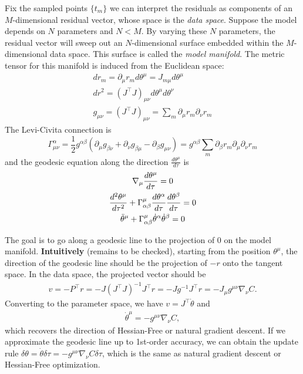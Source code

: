 \documentclass{amsart}
\theoremstyle{definition}
\theoremstyle{remark}
\numberwithin{equation}{section}
\begin{document}
Fix the sampled points $\{t_m\}$ we can interpret the residuals as components of an $M$-dimensional residual vector, whose space is the \emph{data space}. Suppose the model depends on $N$ parameters and $N < M$. By varying these $N$ parameters, the residual vector will sweep out an $N$-dimensional surface embedded within the $M$-dimensional data space. This surface is called the \textit{model manifold}. The metric tensor for this manifold is induced from the Euclidean space:
\begin{gather*}
dr_m = \partial_\mu r_m d\theta^\mu = J_{m\mu} d\theta^\mu\\
dr^2 = (J^\intercal J)_{\mu\nu} d\theta^\mu d\theta^\nu\\
g_{\mu\nu} = (J^\intercal J)_{\mu\nu} = \sum_m \partial_\mu r_m \partial_\nu r_m
\end{gather*}
The Levi-Civita connection is 
\[
 \Gamma_{\mu\nu}^\alpha = \frac{1}{2} g^{\alpha\beta} (\partial_\mu g_{\beta\nu} + \partial_\nu g_{\beta\mu} - \partial_\beta g_{\mu\nu}) = g^{\alpha\beta} \sum_{m} \partial_\beta r_m \partial_\mu\partial_\nu r_m
\]
and the geodesic equation along the direction $\frac{d\theta^\mu}{d\tau}$ is
\begin{gather}
\nabla_\mu \frac{d\theta^\mu}{d\tau} = 0\notag\\
\frac{d^2 \theta^\mu}{d\tau^2} + \Gamma_{\alpha\beta}^\mu \frac{d\theta^\alpha}{d\tau}\frac{d\theta^\beta}{d\tau}=0\notag\\
\ddot \theta^\mu + \Gamma_{\alpha\beta}^\mu \dot \theta^\alpha \dot \theta^\beta = 0 \label{geoeqn}
\end{gather}

The goal is to go along a geodesic line to the projection of $0$ on the model manifold. \textbf{Intuitively} (remains to be checked), starting from the position $\theta^\mu$, the direction of the geodesic line should be the projection of $-r$ onto the tangent space. In the data space, the projected vector should be
\begin{align}
	v = -P^\intercal r = -J(J^\intercal J)^{-1}J^\intercal r = -J g^{-1} J^\intercal r = -J_{\mu}g^{\mu\nu}\nabla_\nu C.
\end{align}
Converting to the parameter space, we have $v = J^\intercal \dot \theta$ and
\begin{align}
	\dot \theta^\mu = - g^{\mu\nu} \nabla_\nu C,
\end{align}
which recovers the direction of Hessian-Free or natural gradient descent. If we approximate the geodesic line up to 1st-order accuracy, we can obtain the update rule $\delta \theta = \dot \theta \delta \tau = - g^{\mu\nu} \nabla_\nu C \delta\tau$, which is the same as natural gradient descent or Hessian-Free optimization.
\end{document}
